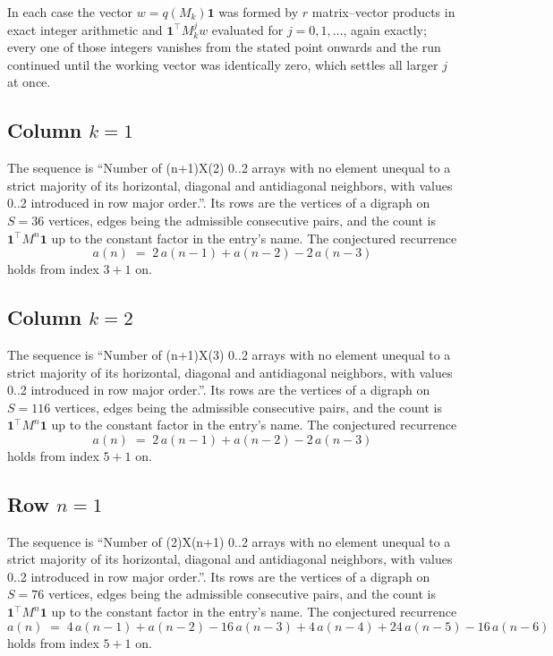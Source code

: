 \documentclass[11pt,a4paper]{article}
\theoremstyle{plain}
\theoremstyle{definition}
\begin{document}
In each case the vector $w=q(M_k)\mathbf{1}$ was formed by $r$ matrix--vector products in
exact integer arithmetic and $\mathbf{1}^{\!\top}M_k^{j}w$ evaluated for $j=0,1,\dots$,
again exactly; every one of those integers vanishes from the stated point onwards and the run
continued until the working vector was identically zero, which settles all larger $j$ at once.

\subsection*{Column $k$$=1$}
The sequence is ``Number of (n+1)X(2) 0..2 arrays with no element unequal to a strict majority of its horizontal, diagonal and antidiagonal neighbors, with values 0..2 introduced in row major order.''. Its rows are the vertices of a digraph on
$S=36$ vertices, edges being the admissible consecutive pairs, and the count is
$\mathbf{1}^{\!\top}M^{n}\mathbf{1}$ up to the constant factor in the entry's name.
The conjectured recurrence
\[
a(n)\;=\;2\,a(n-1) + a(n-2) - 2\,a(n-3)
\]
holds from index $3+1$ on.

\subsection*{Column $k$$=2$}
The sequence is ``Number of (n+1)X(3) 0..2 arrays with no element unequal to a strict majority of its horizontal, diagonal and antidiagonal neighbors, with values 0..2 introduced in row major order.''. Its rows are the vertices of a digraph on
$S=116$ vertices, edges being the admissible consecutive pairs, and the count is
$\mathbf{1}^{\!\top}M^{n}\mathbf{1}$ up to the constant factor in the entry's name.
The conjectured recurrence
\[
a(n)\;=\;2\,a(n-1) + a(n-2) - 2\,a(n-3)
\]
holds from index $5+1$ on.

\subsection*{Row $n$$=1$}
The sequence is ``Number of (2)X(n+1) 0..2 arrays with no element unequal to a strict majority of its horizontal, diagonal and antidiagonal neighbors, with values 0..2 introduced in row major order.''. Its rows are the vertices of a digraph on
$S=76$ vertices, edges being the admissible consecutive pairs, and the count is
$\mathbf{1}^{\!\top}M^{n}\mathbf{1}$ up to the constant factor in the entry's name.
The conjectured recurrence
\[
a(n)\;=\;4\,a(n-1) + a(n-2) - 16\,a(n-3) + 4\,a(n-4) + 24\,a(n-5) - 16\,a(n-6)
\]
holds from index $5+1$ on.
\end{document}
